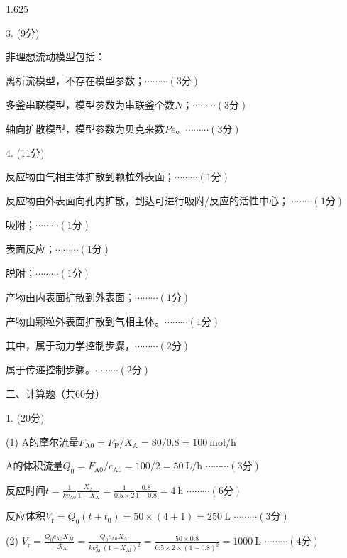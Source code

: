 \documentclass[12pt, b5paper]{article}
\begin{document}
\begin{spacing}{1.625}
\bigskip

3. (9分) 

非理想流动模型包括：

 离析流模型，不存在模型参数；\hfill $\cdots \cdots \cdots (3\text{分})$

 多釜串联模型，模型参数为串联釜个数$N$；\hfill $\cdots \cdots \cdots (3\text{分})$

 轴向扩散模型，模型参数为贝克来数$Pe$。\hfill $\cdots \cdots \cdots (3\text{分})$

\bigskip

4. (11分) 

 反应物由气相主体扩散到颗粒外表面；\hfill $\cdots \cdots \cdots (1\text{分})$

 反应物由外表面向孔内扩散，到达可进行吸附/反应的活性中心；\hfill $\cdots \cdots \cdots (1\text{分})$

 吸附；\hfill $\cdots \cdots \cdots (1\text{分})$

 表面反应；\hfill $\cdots \cdots \cdots (1\text{分})$

 脱附；\hfill $\cdots \cdots \cdots (1\text{分})$

 产物由内表面扩散到外表面；\hfill $\cdots \cdots \cdots (1\text{分})$

 产物由颗粒外表面扩散到气相主体。\hfill $\cdots \cdots \cdots (1\text{分})$

其中，属于动力学控制步骤，\hfill $\cdots \cdots \cdots (2\text{分})$

属于传递控制步骤。\hfill $\cdots \cdots \cdots (2\text{分})$

\bigskip

二、计算题（共60分）

1. (20分) 

(1) A的摩尔流量$F_\mathrm{A0} = F_\mathrm{P}/X_\mathrm{A} = 80/0.8 = 100 \ \mathrm{mol/h}$ 

A的体积流量$Q_0 = F_\mathrm{A0}/c_\mathrm{A0} = 100/2 = 50 \ \mathrm{L/h}$ \hfill $\cdots \cdots \cdots (3\text{分})$

反应时间$t = \frac{1}{kc_\mathrm{A0}}\frac{X_\mathrm{A}}{1-X_\mathrm{A}} = \frac{1}{0.5\times 2}\frac{0.8}{1-0.8} = 4\ \mathrm{h}$ \hfill $\cdots \cdots \cdots (6\text{分})$

反应体积$V_\mathrm{r} = Q_0(t+t_0) = 50\times (4+1) = 250\ \mathrm{L}$ \hfill $\cdots \cdots \cdots (3\text{分})$

(2) $V_\mathrm{r} = \frac{Q_0c_\mathrm{A0}X_\mathrm{Af}}{-\mathscr{R}_\mathrm{A}} = \frac{Q_0c_\mathrm{A0}X_\mathrm{Af}}{kc_\mathrm{A0}^2(1-X_\mathrm{Af})^2} = \frac{50\times 0.8}{0.5\times 2\times (1-0.8)^2} = 1000 \ \mathrm{L}$ \hfill $\cdots \cdots \cdots (4\text{分})$


\end{spacing}
\end{document}
